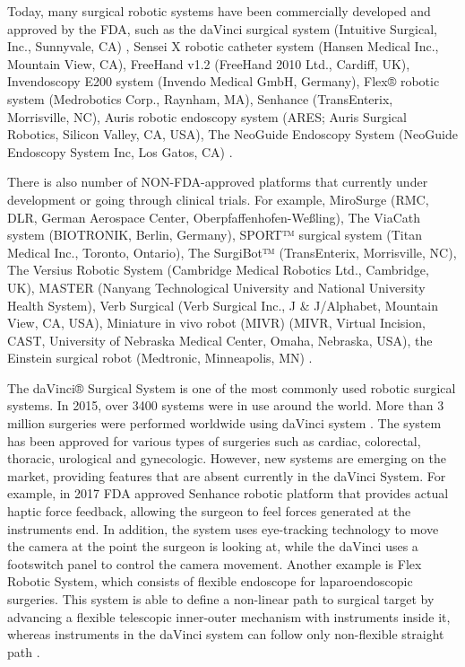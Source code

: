 Today, many surgical robotic systems have been commercially developed and approved by the FDA, such as the daVinci surgical system (Intuitive Surgical, Inc., Sunnyvale, CA) , Sensei X robotic catheter system (Hansen Medical Inc., Mountain View, CA), FreeHand v1.2 (FreeHand 2010 Ltd., Cardiff, UK), Invendoscopy E200 system (Invendo Medical GmbH, Germany), Flex® robotic system (Medrobotics Corp., Raynham, MA), Senhance (TransEnterix, Morrisville, NC), Auris robotic endoscopy system (ARES; Auris Surgical Robotics, Silicon Valley, CA, USA), The NeoGuide Endoscopy System (NeoGuide Endoscopy System Inc, Los Gatos, CA) \cite{lanfranco_robotic_2004,peters_review_2018}.

There is also number of NON-FDA-approved platforms that currently under development or going through clinical trials. For example, MiroSurge (RMC, DLR, German Aerospace Center, Oberpfaffenhofen-Weßling), The ViaCath system (BIOTRONIK, Berlin, Germany), SPORT™ surgical system (Titan Medical Inc., Toronto, Ontario), The SurgiBot™ (TransEnterix, Morrisville, NC), The Versius Robotic System (Cambridge Medical Robotics Ltd., Cambridge, UK), MASTER (Nanyang Technological University and National University Health System), Verb Surgical (Verb Surgical Inc., J \& J/Alphabet, Mountain View, CA, USA), Miniature in vivo robot (MIVR) (MIVR, Virtual Incision, CAST, University of Nebraska Medical Center, Omaha, Nebraska, USA), the Einstein surgical robot (Medtronic, Minneapolis, MN) \cite{peters_review_2018}.

The daVinci® Surgical System is one of the most commonly used robotic surgical systems. In 2015, over 3400 systems were in use around the world. More than 3 million surgeries were performed worldwide using daVinci system \cite{_intuitive_2018}. The system has been approved for various types of surgeries such as cardiac, colorectal, thoracic, urological and gynecologic. However, new systems are emerging on the market, providing features that are absent currently in the daVinci System. For example, in 2017 FDA approved Senhance robotic platform that provides actual haptic force feedback, allowing the surgeon to feel forces generated at the instruments end. In addition, the system uses eye-tracking technology to move the camera at the point the surgeon is looking at, while the daVinci uses a footswitch panel to control the camera movement. Another example is Flex Robotic System, which consists of flexible endoscope for laparoendoscopic surgeries. This system is able to define a non-linear path to surgical target by advancing a flexible telescopic inner-outer mechanism with instruments inside it, whereas instruments in the daVinci system can follow only non-flexible straight path \cite{peters_review_2018}.

